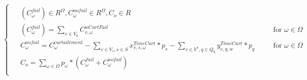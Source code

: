 \documentclass[a4paper,12pt]{article}
\begin{document}
\begin {enumerate}
{    \begin{equation}
        \begin{cases}
            \begin{alignedat}{2}
                & (C_{\omega}^{fail}) \in R^{\Omega}, C_{\omega}^{nofail} \in R^{\Omega}, C_{o} \in R\\
                & (C_{\omega}^{fail}) = \sum_{v \in V_{0}} C_{v,\omega}^{wCurtFail} &&\quad \text{for } \omega \in \Omega \\
                & C_{\omega}^{nofail} = C_\omega^{curtailement} - \sum_{v \in V_{s},s \in S} x_{v,s,\omega}^{TimeCurt}*p_s - \sum_{v \in V^s, q \in Q_{0}} y_{e,q,w}^{TimeCurt}*p_{q} && \quad \text{for } \omega \in \Omega \\
                & C_{o} = \sum_{\omega \in \Omega} p_{\omega} * (C_{\omega}^{fail} + C_{\omega}^{nofail}) \\
            \end{alignedat}
        \end{cases}
    \end{equation}
}


\end{enumerate}
\end{document}
